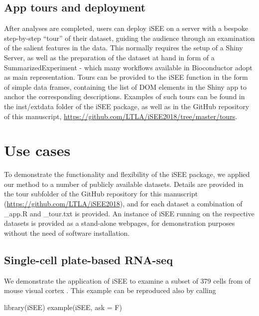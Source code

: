 \documentclass[10pt,a4paper,twocolumn]{article}
\begin{document}
\subsection*{App tours and deployment}
After analyses are completed, users can deploy iSEE on a server with a bespoke step-by-step ``tour'' of their dataset, guiding the audience through an examination of the salient features in the data.
This normally requires the setup of a Shiny Server, %
as well as the preparation of the dataset at hand in form of a SummarizedExperiment - which many workflows available in Bioconductor adopt as main representation.
Tours can be provided to the iSEE function in the form of simple data frames, containing the list of DOM elements in the Shiny app to anchor the corresponding descriptions.
Examples of such tours can be found in the inst/extdata folder of the iSEE package, as well as in the GitHub repository of this manuscript, \url{https://github.com/LTLA/iSEE2018/tree/master/tours}.


\section*{Use cases} %
To demonstrate the functionality and flexibility of the iSEE package, we applied our method to a number of publicly available datasets.
Details are provided in the tour subfolder of the GitHub repository for this manuscript (\url{https://github.com/LTLA/iSEE2018}), and for each dataset a combination of \_app.R and \_tour.txt is provided.
An instance of iSEE running on the respective datasets is provided as a stand-alone webpages, for demonstration purposes without the need of software installation.

\subsection*{Single-cell plate-based RNA-seq}
We demonstrate the application of iSEE to examine a subset of 379 cells from of mouse visual cortex \citep{tasic2016allen}.
This example can be reproduced also by calling

library(iSEE)
example(iSEE, ask = F)
\end{document}

